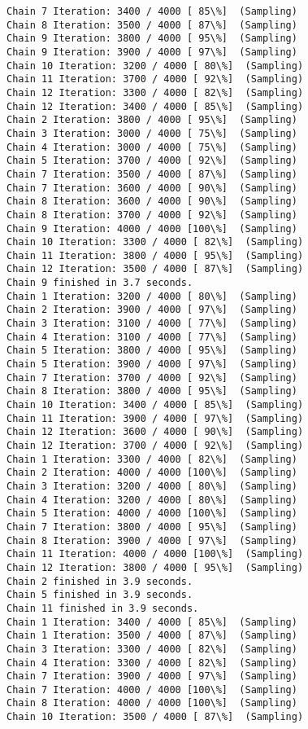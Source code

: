 \documentclass[11pt]{article}
\begin{document}
\begin{Verbatim}[commandchars=\\\{\}]
Chain 7 Iteration: 3400 / 4000 [ 85\%]  (Sampling)
Chain 8 Iteration: 3500 / 4000 [ 87\%]  (Sampling)
Chain 9 Iteration: 3800 / 4000 [ 95\%]  (Sampling)
Chain 9 Iteration: 3900 / 4000 [ 97\%]  (Sampling)
Chain 10 Iteration: 3200 / 4000 [ 80\%]  (Sampling)
Chain 11 Iteration: 3700 / 4000 [ 92\%]  (Sampling)
Chain 12 Iteration: 3300 / 4000 [ 82\%]  (Sampling)
Chain 12 Iteration: 3400 / 4000 [ 85\%]  (Sampling)
Chain 2 Iteration: 3800 / 4000 [ 95\%]  (Sampling)
Chain 3 Iteration: 3000 / 4000 [ 75\%]  (Sampling)
Chain 4 Iteration: 3000 / 4000 [ 75\%]  (Sampling)
Chain 5 Iteration: 3700 / 4000 [ 92\%]  (Sampling)
Chain 7 Iteration: 3500 / 4000 [ 87\%]  (Sampling)
Chain 7 Iteration: 3600 / 4000 [ 90\%]  (Sampling)
Chain 8 Iteration: 3600 / 4000 [ 90\%]  (Sampling)
Chain 8 Iteration: 3700 / 4000 [ 92\%]  (Sampling)
Chain 9 Iteration: 4000 / 4000 [100\%]  (Sampling)
Chain 10 Iteration: 3300 / 4000 [ 82\%]  (Sampling)
Chain 11 Iteration: 3800 / 4000 [ 95\%]  (Sampling)
Chain 12 Iteration: 3500 / 4000 [ 87\%]  (Sampling)
Chain 9 finished in 3.7 seconds.
Chain 1 Iteration: 3200 / 4000 [ 80\%]  (Sampling)
Chain 2 Iteration: 3900 / 4000 [ 97\%]  (Sampling)
Chain 3 Iteration: 3100 / 4000 [ 77\%]  (Sampling)
Chain 4 Iteration: 3100 / 4000 [ 77\%]  (Sampling)
Chain 5 Iteration: 3800 / 4000 [ 95\%]  (Sampling)
Chain 5 Iteration: 3900 / 4000 [ 97\%]  (Sampling)
Chain 7 Iteration: 3700 / 4000 [ 92\%]  (Sampling)
Chain 8 Iteration: 3800 / 4000 [ 95\%]  (Sampling)
Chain 10 Iteration: 3400 / 4000 [ 85\%]  (Sampling)
Chain 11 Iteration: 3900 / 4000 [ 97\%]  (Sampling)
Chain 12 Iteration: 3600 / 4000 [ 90\%]  (Sampling)
Chain 12 Iteration: 3700 / 4000 [ 92\%]  (Sampling)
Chain 1 Iteration: 3300 / 4000 [ 82\%]  (Sampling)
Chain 2 Iteration: 4000 / 4000 [100\%]  (Sampling)
Chain 3 Iteration: 3200 / 4000 [ 80\%]  (Sampling)
Chain 4 Iteration: 3200 / 4000 [ 80\%]  (Sampling)
Chain 5 Iteration: 4000 / 4000 [100\%]  (Sampling)
Chain 7 Iteration: 3800 / 4000 [ 95\%]  (Sampling)
Chain 8 Iteration: 3900 / 4000 [ 97\%]  (Sampling)
Chain 11 Iteration: 4000 / 4000 [100\%]  (Sampling)
Chain 12 Iteration: 3800 / 4000 [ 95\%]  (Sampling)
Chain 2 finished in 3.9 seconds.
Chain 5 finished in 3.9 seconds.
Chain 11 finished in 3.9 seconds.
Chain 1 Iteration: 3400 / 4000 [ 85\%]  (Sampling)
Chain 1 Iteration: 3500 / 4000 [ 87\%]  (Sampling)
Chain 3 Iteration: 3300 / 4000 [ 82\%]  (Sampling)
Chain 4 Iteration: 3300 / 4000 [ 82\%]  (Sampling)
Chain 7 Iteration: 3900 / 4000 [ 97\%]  (Sampling)
Chain 7 Iteration: 4000 / 4000 [100\%]  (Sampling)
Chain 8 Iteration: 4000 / 4000 [100\%]  (Sampling)
Chain 10 Iteration: 3500 / 4000 [ 87\%]  (Sampling)

\end{Verbatim}
\end{document}

